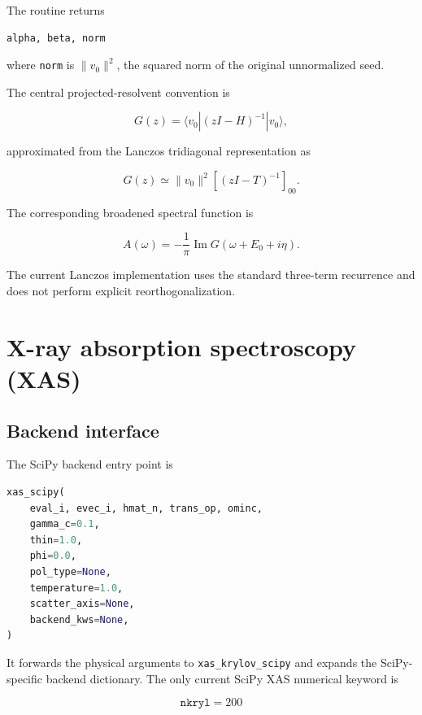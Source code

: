 \documentclass[11pt]{article}
\begin{document}
The routine returns

\begin{lstlisting}
alpha, beta, norm
\end{lstlisting}

where \texttt{norm} is \(\lVert v_0\rVert^2\), the squared norm of the original unnormalized seed.

The central projected-resolvent convention is

\begin{equation}
  G(z)=\langle v_0 |(zI-H)^{-1}|v_0\rangle,
\end{equation}

approximated from the Lanczos tridiagonal representation as

\begin{equation}
  G(z) \simeq \lVert v_0\rVert^2
  \left[(zI-T)^{-1}\right]_{00}.
\end{equation}

The corresponding broadened spectral function is

\begin{equation}
  A(\omega)=-\frac{1}{\pi}\operatorname{Im}
  G(\omega+E_0+i\eta).
\end{equation}

The current Lanczos implementation uses the standard three-term recurrence and does not perform explicit reorthogonalization.

\section{X-ray absorption spectroscopy (XAS)}

\subsection{Backend interface}

The SciPy backend entry point is

\begin{lstlisting}[language=Python]
xas_scipy(
    eval_i, evec_i, hmat_n, trans_op, ominc,
    gamma_c=0.1,
    thin=1.0,
    phi=0.0,
    pol_type=None,
    temperature=1.0,
    scatter_axis=None,
    backend_kws=None,
)
\end{lstlisting}

It forwards the physical arguments to \texttt{xas\_krylov\_scipy} and expands the SciPy-specific backend dictionary.  The only current SciPy XAS numerical keyword is

\begin{equation}
  \texttt{nkryl}=200
\end{equation}
\end{document}
